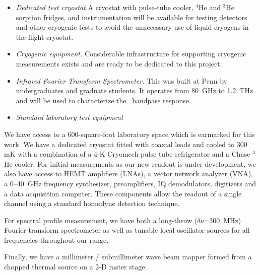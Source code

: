 \begin{itemize}

\item 
{\it Dedicated test cryostat} A cryostat with pulse-tube cooler,
$^4$He and $^3$He sorption fridges, and instrumentation will be
available for testing detectors and other cryogenic tests to avoid the
unnecessary use of liquid cryogens in the flight cryostat.

\item
{\it Cryogenic equipment.} Considerable infrastructure for supporting
cryogenic measurements exists and are ready to be dedicated to this
project.

\item 
{\it Infrared Fourier Transform Spectrometer.} This was built at Penn
by undergraduates and graduate students. It operates from 80~GHz to
1.2~THz and will be used to characterize the \name\ bandpass
response.


\item {\it Standard laboratory test equipment} 

\end{itemize}

\pagebreak


We have access to a 600-square-foot laboratory space which is earmarked for this work.   We have a dedicated cryostat fitted with coaxial leads and cooled to 300 mK with a combination of a 4-K Cryomech pulse tube refrigerator and a Chase $^3$He cooler.   For initial measurements as our new readout is under development,  we also have access to HEMT amplifiers (LNAs), a vector network analyzer (VNA), a 0--40~GHz frequency synthesizer, preamplifiers, IQ demodulators, digitizers and a data acquisition computer.  These components allow the readout of a
single channel using a standard homodyne detection technique. 

For spectral profile measurement, we have both a long-throw ($\delta\nu$=300~MHz) Fourier-transform spectrometer as well as tunable local-oscillator sources for all frequencies throughout our range.

Finally, we have a millimeter / submillimeter wave beam mapper formed from a chopped thermal source on a 2-D raster stage.



